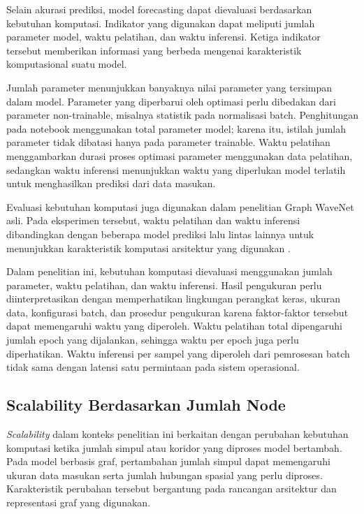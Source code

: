 Selain akurasi prediksi, model forecasting dapat dievaluasi berdasarkan kebutuhan komputasi. Indikator yang digunakan dapat meliputi jumlah parameter model, waktu pelatihan, dan waktu inferensi. Ketiga indikator tersebut memberikan informasi yang berbeda mengenai karakteristik komputasional suatu model.

Jumlah parameter menunjukkan banyaknya nilai parameter yang tersimpan dalam model. Parameter yang diperbarui oleh optimasi perlu dibedakan dari parameter non-trainable, misalnya statistik pada normalisasi batch. Penghitungan pada notebook menggunakan total parameter model; karena itu, istilah jumlah parameter tidak dibatasi hanya pada parameter trainable. Waktu pelatihan menggambarkan durasi proses optimasi parameter menggunakan data pelatihan, sedangkan waktu inferensi menunjukkan waktu yang diperlukan model terlatih untuk menghasilkan prediksi dari data masukan.

Evaluasi kebutuhan komputasi juga digunakan dalam penelitian Graph WaveNet asli. Pada eksperimen tersebut, waktu pelatihan dan waktu inferensi dibandingkan dengan beberapa model prediksi lalu lintas lainnya untuk menunjukkan karakteristik komputasi arsitektur yang digunakan \cite{wu2019graphwavenet}.

Dalam penelitian ini, kebutuhan komputasi dievaluasi menggunakan jumlah parameter, waktu pelatihan, dan waktu inferensi. Hasil pengukuran perlu diinterpretasikan dengan memperhatikan lingkungan perangkat keras, ukuran data, konfigurasi batch, dan prosedur pengukuran karena faktor-faktor tersebut dapat memengaruhi waktu yang diperoleh. Waktu pelatihan total dipengaruhi jumlah epoch yang dijalankan, sehingga waktu per epoch juga perlu diperhatikan. Waktu inferensi per sampel yang diperoleh dari pemrosesan batch tidak sama dengan latensi satu permintaan pada sistem operasional.

\subsection{Scalability Berdasarkan Jumlah Node}
\label{subsec:graph_scalability}

\textit{Scalability} dalam konteks penelitian ini berkaitan dengan perubahan kebutuhan komputasi ketika jumlah simpul atau koridor yang diproses model bertambah. Pada model berbasis graf, pertambahan jumlah simpul dapat memengaruhi ukuran data masukan serta jumlah hubungan spasial yang perlu diproses. Karakteristik perubahan tersebut bergantung pada rancangan arsitektur dan representasi graf yang digunakan.

